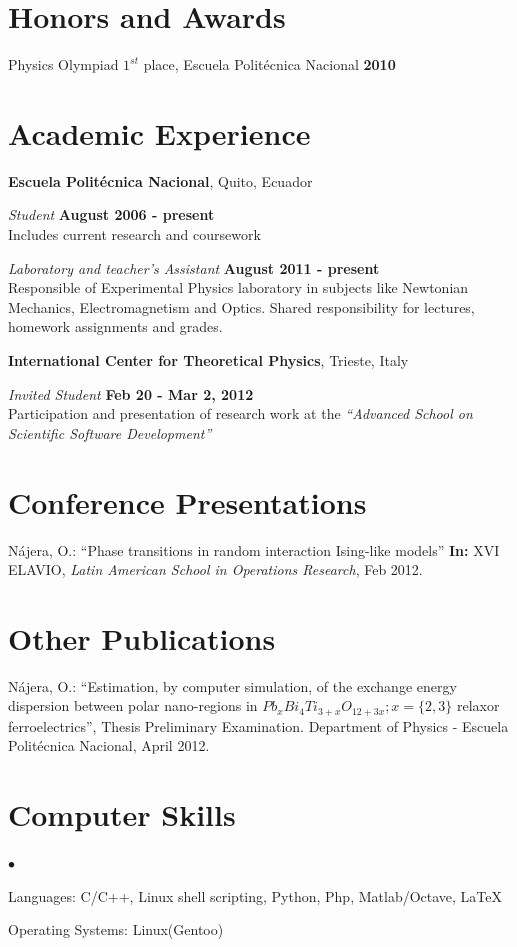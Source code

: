 \documentclass[margin,line]{res}
\newenvironment{list2}{
  \begin{list}{$\bullet$}{%
      \setlength{\itemsep}{0in}
      \setlength{\parsep}{0in} \setlength{\parskip}{0in}
      \setlength{\topsep}{0in} \setlength{\partopsep}{0in} 
      \setlength{\leftmargin}{0.2in}}}{\end{list}}
\begin{document}
\begin{resume}
\section{\sc Honors and Awards}
  Physics Olympiad $1^{st}$ place, Escuela Politécnica Nacional \hfill {\bf 2010}

\section{\sc Academic Experience}
  {\bf Escuela Politécnica Nacional}, Quito, Ecuador

  \vspace{-.3cm}
  {\em Student} \hfill {\bf August 2006 - present}\\
  Includes current research and coursework

  {\em Laboratory and teacher's Assistant} \hfill {\bf August 2011 - present}\\
  Responsible of Experimental Physics laboratory in subjects
  like Newtonian Mechanics, Electromagnetism and Optics.
  Shared responsibility for lectures, homework assignments and grades.

  {\bf International Center for Theoretical Physics}, Trieste, Italy

  \vspace{-.3cm}
  {\em Invited Student} \hfill {\bf Feb 20 - Mar 2, 2012} \\
  Participation and presentation of research work at the {\em ``Advanced School on Scientific
  Software Development''}

\section{\sc Conference Presentations}
  Nájera, O.: ``Phase transitions in random interaction Ising-like models'' {\bf In:} XVI ELAVIO,
  {\em Latin American School in Operations Research}, Feb 2012.

\section{\sc Other Publications}
  Nájera, O.: ``Estimation, by computer simulation, of the exchange energy dispersion between
  polar nano-regions in $Pb_xBi_4Ti_{3+x}O_{12+3x}; x=\{2,3\}$ relaxor ferroelectrics'', Thesis
  Preliminary Examination. Department of Physics - Escuela Politécnica Nacional, April 2012.


\section{\sc Computer Skills}
  \begin{list2}
    \item Languages:  C/C++, Linux shell scripting, Python, Php, Matlab/Octave, \LaTeX
    \item Operating Systems:  Linux(Gentoo)
  \end{list2}


\end{resume}
\end{document}
